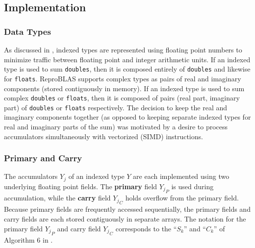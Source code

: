 \documentclass[12pt]{article}
\theoremstyle{definition}
\numberwithin{equation}{section}
\begin{document}
  \subsection{Implementation}
    \subsubsection{Data Types}
      \label{sec:indexed_implementation_datatypes}
      As discussed in \cite{repsum}, indexed types are represented using floating point numbers to minimize traffic between floating point and integer arithmetic units. If an indexed type is used to sum \verb|doubles|, then it is composed entirely of \verb|doubles| and likewise for \verb|floats|. ReproBLAS supports complex types as pairs of real and imaginary components (stored contiguously in memory). If an indexed type is used to sum complex \verb|doubles| or \verb|floats|, then it is composed of pairs (real part, imaginary part) of \verb|doubles| or \verb|floats| respectively. The decision to keep the real and imaginary components together (as opposed to keeping separate indexed types for real and imaginary parts of the sum) was motivated by a desire to process accumulators simultaneously with vectorized (SIMD) instructions.

    \subsubsection{Primary and Carry}
      \label{sec:indexed_implementation_primary_carry}
      The accumulators $Y_j$ of an indexed type $Y$ are each implemented using two underlying floating point fields. The \textbf{primary} field ${Y_j}_P$ is used during accumulation, while the \textbf{carry} field ${Y_j}_C$ holds overflow from the primary field. Because primary fields are frequently accessed sequentially, the primary fields and carry fields are each stored contiguously in separate arrays. The notation for the primary field ${Y_j}_P$ and carry field ${Y_j}_C$ corresponds to the ``$S_k$'' and ``$C_k$'' of Algorithm $6$ in \cite{repsum}.
\end{document}
